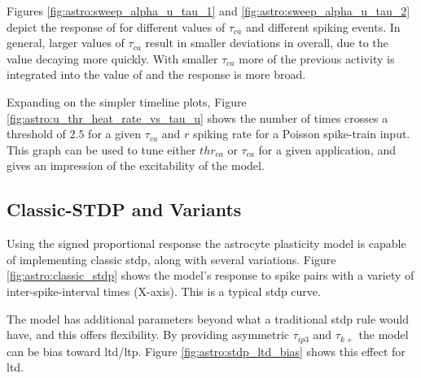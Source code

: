 

Figures \ref{fig:astro:sweep_alpha_u_tau_1} and
\ref{fig:astro:sweep_alpha_u_tau_2} depict the response of \ca for
different values of $\tau_{ca}$ and different spiking events. In general,
larger values of $\tau_{ca}$ result in smaller deviations in \ca overall, due
to the value decaying more quickly. With smaller $\tau_{ca}$ more of the
previous activity is integrated into the value of \ca and the response is
more broad.

Expanding on the simpler timeline plots, Figure
\ref{fig:astro:u_thr_heat_rate_vs_tau_u} shows the number of times \ca crosses a
threshold of $2.5$ for a given $\tau_{ca}$ and $r$ spiking rate for a Poisson
spike-train input. This graph can be used to tune either $thr_{ca}$ or $\tau_{ca}$
for a given application, and gives an impression of the excitability of the
model.


\subsection{Classic-STDP and Variants} \label{sec:ordered_prop:stdp}

Using the signed proportional \ca response the astrocyte plasticity model is
capable of implementing classic \gls{stdp}, along with several variations. Figure
\ref{fig:astro:classic_stdp} shows the model's response to spike pairs with
a variety of inter-spike-interval times (X-axis). This is a typical \gls{stdp}
curve.


The model has additional parameters beyond what a traditional \gls{stdp} rule
would have, and this offers flexibility. By providing asymmetric
$\tau_{ip3}$ and $\tau_{k+}$ the model can be bias toward \gls{ltd}/\gls{ltp}. Figure
\ref{fig:astro:stdp_ltd_bias} shows this effect for \gls{ltd}.

